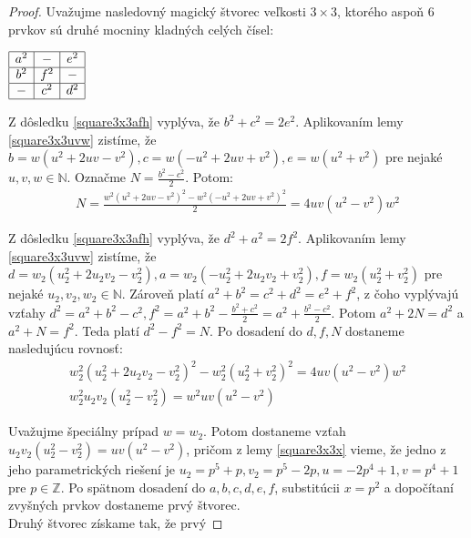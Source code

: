 \begin{proof} 
Uvažujme nasledovný magický štvorec veľkosti $3 \times 3$, ktorého aspoň $6$ prvkov sú druhé mocniny kladných celých čísel: \\

\begin{center}
$\begin{array}{ |c|c|c| } 
\hline
a^2 & - & e^2 \\ 
\hline
b^2 & f^2 & - \\ 
\hline
- & c^2 & d^2 \\
\hline
\end{array}$
\end{center}

Z dôsledku \ref{square3x3afh} vyplýva, že $b^2 + c^2 = 2e^2$. Aplikovaním lemy \ref{square3x3uvw} zistíme, že $b = w(u^2 + 2uv - v^2), c = w(- u^2 + 2uv + v^2), e = w(u^2 + v^2)$ pre nejaké $u,v,w \in \mathbb{N}$. Označme $N = \frac{b^2 - c^2}{2}$. Potom:
\begin{gather*}
N = \frac{w^2(u^2 + 2uv - v^2)^2 - w^2(- u^2 + 2uv + v^2)^2}{2} = 4uv(u^2 - v^2)w^2
\end{gather*}

Z dôsledku \ref{square3x3afh} vyplýva, že $d^2 + a^2 = 2f^2$. Aplikovaním lemy \ref{square3x3uvw} zistíme, že $d = w_2(u_2^2 + 2u_2 v_2 - v_2^2), a = w_2(- u_2^2 + 2u_2 v_2 + v_2^2), f = w_2(u_2^2 + v_2^2)$ pre nejaké $u_2,v_2,w_2 \in \mathbb{N}$. Zároveň platí $a^2 + b^2 = c^2 + d^2 = e^2 + f^2$, z čoho vyplývajú vzťahy $d^2 = a^2 + b^2 - c^2, f^2 = a^2 + b^2 - \frac{b^2 + c^2}{2} = a^2 + \frac{b^2 - c^2}{2}$.  Potom $a^2 + 2N = d^2$ a $a^2 + N = f^2$. Teda platí $d^2 - f^2 = N$. Po dosadení do $d,f,N$ dostaneme nasledujúcu rovnosť:
\begin{gather*}
w_2^2(u_2^2 + 2u_2 v_2 - v_2^2)^2 - w_2^2(u_2^2 + v_2^2)^2 = 4u v(u^2 - v^2)w^2 \\
w_2^2 u_2 v_2 (u_2^2 - v_2^2) = w^2 uv (u^2 - v^2)
\end{gather*}
 
Uvažujme špeciálny prípad $w = w_2$. Potom dostaneme vzťah $u_2 v_2 (u_2^2 - v_2^2) = uv (u^2 - v^2)$, pričom z lemy \ref{square3x3x} vieme, že jedno z jeho parametrických riešení je $u_2 = p^5 + p, v_2 = p^5 - 2p, u = -2p^4 + 1, v = p^4 + 1$ pre $p \in \mathbb{Z}$. Po spätnom dosadení do $a,b,c,d,e,f$, substitúcii $x = p^2$ a dopočítaní zvyšných prvkov dostaneme prvý štvorec. \\

Druhý štvorec získame tak, že prvý


\end{proof}
